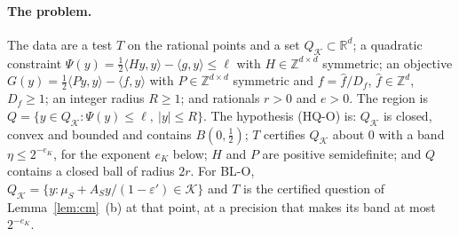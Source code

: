 \documentclass[11pt]{amsart}
\theoremstyle{definition}
\numberwithin{equation}{section}
\newcommand{\R}{\mathbb{R}}
\newcommand{\cK}{\mathcal{K}}
\newcommand{\ip}[1]{\langle #1\rangle}
\begin{document}
\paragraph{The problem.} The data are a test $T$ on the rational points and a set $Q_\cK\subset\R^d$; a quadratic constraint $\Psi(y)=\frac12\ip{Hy,y}-\ip{g,y}\le\ell$ with $H\in\mathbb Z^{d\times d}$ symmetric; an objective $G(y)=\frac12\ip{Py,y}-\ip{f,y}$ with $P\in\mathbb Z^{d\times d}$ symmetric and $f=\hat f/D_f$, $\hat f\in\mathbb Z^d$, $D_f\ge1$; an integer radius $R\ge1$; and rationals $r>0$ and $e>0$. The region is $Q=\{y\in Q_\cK:\Psi(y)\le\ell,\ |y|\le R\}$. The hypothesis (HQ-O) is: $Q_\cK$ is closed, convex and bounded and contains $B(0,\frac12)$; $T$ certifies $Q_\cK$ about $0$ with a band $\eta\le2^{-e_K}$, for the exponent $e_K$ below; $H$ and $P$ are positive semidefinite; and $Q$ contains a closed ball of radius $2r$. For BL-O, $Q_\cK=\{y:\mu_S+A_Sy/(1-\varepsilon')\in\cK\}$ and $T$ is the certified question of Lemma~\ref{lem:cm}~(b) at that point, at a precision that makes its band at most $2^{-e_K}$.
\end{document}
